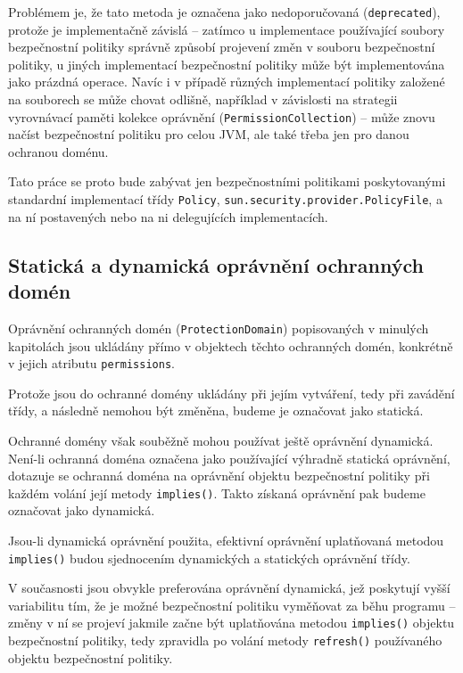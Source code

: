 Problémem je, že tato metoda je označena jako nedoporučovaná ({\tt deprecated}), protože je implementačně závislá -- zatímco u implementace používající soubory bezpečnostní politiky správně způsobí projevení změn v souboru bezpečnostní politiky, u jiných implementací bezpečnostní politiky může být implementována jako prázdná operace. Navíc i v případě různých implementací politiky založené na souborech se může chovat odlišně, například v závislosti na strategii vyrovnávací paměti kolekce oprávnění ({\tt PermissionCollection}) -- může znovu načíst bezpečnostní politiku pro celou JVM, ale také třeba jen pro danou ochranou doménu. \cite{refPolicy}

Tato práce se proto bude zabývat jen bezpečnostními politikami poskytovanými standardní implementací třídy {\tt Policy}, {\tt sun.security.provider.PolicyFile}, a na ní postavených nebo na ni delegujících implementacích.

\subsection{Statická a dynamická oprávnění ochranných domén} \label{staticPerm}

Oprávnění ochranných domén ({\tt ProtectionDomain}) popisovaných v minulých kapitolách jsou ukládány přímo v objektech těchto ochranných domén,
konkrétně v jejich atributu {\tt permissions}. \cite{sourceProtectionDomain}

Protože jsou do ochranné domény ukládány při jejím vytváření, tedy při zavádění třídy, a následně nemohou být změněna, budeme je označovat jako statická.

Ochranné domény však souběžně mohou používat ještě oprávnění dynamická. Není-li ochranná doména označena jako používající výhradně statická oprávnění,
dotazuje se ochranná doména na oprávnění objektu bezpečnostní politiky při každém volání její metody {\tt implies()}.
Takto získaná oprávnění pak budeme označovat jako dynamická. \cite{sourceProtectionDomain}

Jsou-li dynamická oprávnění použita, efektivní oprávnění uplatňovaná metodou {\tt implies()} budou sjednocením dynamických a statických oprávnění třídy.
\cite{sourceProtectionDomain}

V současnosti jsou obvykle preferována oprávnění dynamická, jež poskytují vyšší variabilitu tím, že je možné bezpečnostní politiku vyměňovat za běhu
programu -- změny v ní se projeví jakmile začne být uplatňována metodou {\tt implies()} objektu bezpečnostní politiky, tedy zpravidla po volání metody
{\tt refresh()} používaného objektu bezpečnostní politiky.

